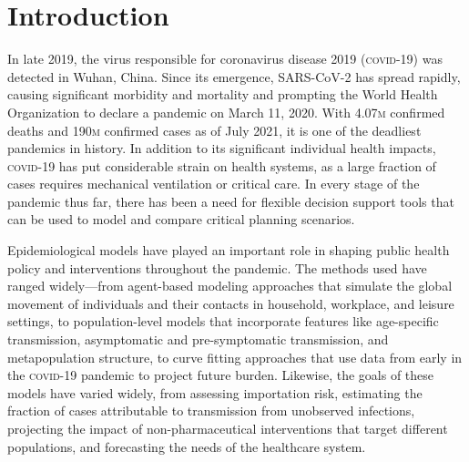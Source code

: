 

\section{Introduction}

In late 2019, the virus responsible for coronavirus disease 2019 (\textsc{covid}-19) was detected in Wuhan, China\cite{Zhu:NovelCoronavirusPatients:2020}. Since its emergence, SARS-CoV-2 has spread rapidly, causing significant morbidity and mortality and prompting the World Health Organization to declare a pandemic on March 11, 2020\cite{WHO:WHODirectorGeneralOpening:2020}. With 4.07\textsc{m} confirmed deaths and 190\textsc{m} confirmed cases as of July 2021, it is one of the deadliest pandemics in history. In addition to its significant individual health impacts, \textsc{covid}-19 has put considerable strain on health systems, as a large fraction of cases requires mechanical ventilation or critical care\cite{Huang:ClinicalFeaturesPatients:2020}. In every stage of the pandemic thus far, there has been a need for flexible decision support tools that can be used to model and compare critical planning scenarios. 

Epidemiological models have played an important role in shaping public health policy and interventions throughout the pandemic. The methods used have ranged widely—from agent-based modeling approaches that simulate the global movement of individuals and their contacts in household, workplace, and leisure settings\cite{Ferguson:ReportImpactNonpharmaceutical:2020}, to population-level models that incorporate features like age-specific transmission, asymptomatic and pre-symptomatic transmission, and metapopulation structure\cite{Chinazzi:EffectTravelRestrictions:2020,Branas:FlatteningCurveIt:2020,Moghadas:ProjectingHospitalUtilization:2020,Davies:AgedependentEffectsTransmission:2020}, to curve fitting approaches that use data from early in the \textsc{covid}-19 pandemic to project future burden\cite{IHME:ForecastingImpactFirst:2020}. Likewise, the goals of these models have varied widely, from assessing importation risk, estimating the fraction of cases attributable to transmission from unobserved infections, projecting the impact of non-pharmaceutical interventions that target different populations, and forecasting the needs of the healthcare system. 

